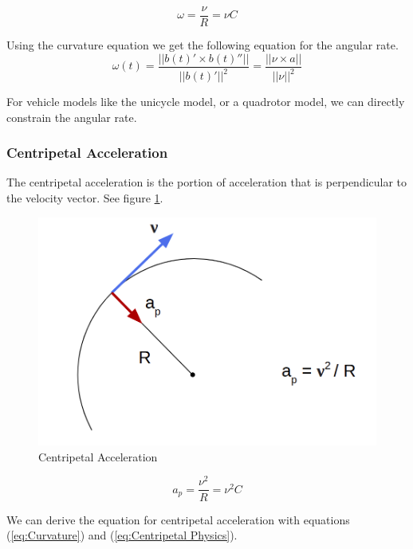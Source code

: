 \documentclass{article}
\begin{document}
\begin{equation}
    \omega = \frac{\nu}{R} = \nu C
\end{equation}

Using the curvature equation we get the following equation for the angular rate.
\begin{equation}
    \omega(t) = \frac{||b(t)' \times b(t)''||}{||b(t)'||^2} = \frac{||\nu \times a||}{||\nu||^2}
\end{equation}

For vehicle models like the unicycle model, or a quadrotor model, we can directly constrain the angular rate.

\subsubsection{Centripetal Acceleration}

The centripetal acceleration is the portion of acceleration that is perpendicular to the velocity vector. See figure \ref{Centripetal_Acceleration}.

\begin{figure}[h]
\centering
\includegraphics[scale=.22]{CentripetalAcceleration.png}
\caption{Centripetal Acceleration}
\label{Centripetal_Acceleration}
\end{figure}

\begin{equation} \label{eq:Centripetal Physics}
    a_p = \frac{\nu^2}{R} = \nu^2 C
\end{equation}

We can derive the equation for centripetal acceleration with equations (\ref{eq:Curvature}) and (\ref{eq:Centripetal Physics}).
\end{document}
